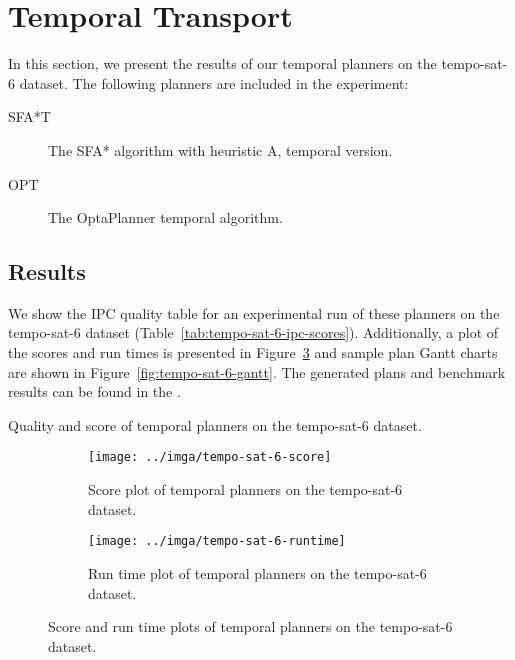 \section{Temporal Transport}

In this section, we present the results of our temporal planners on the tempo-sat-6 dataset. The following planners are included in the experiment:
\begin{description}
\item[SFA*T] The SFA* algorithm with heuristic A, temporal version. 
\item[OPT] The OptaPlanner temporal algorithm. 
\end{description}

\subsection{Results}\label{temporal-results}

We show the IPC quality table
for an experimental run of these planners on the tempo-sat-6 dataset (Table~\ref{tab:tempo-sat-6-ipc-scores}).
Additionally, a plot of the scores and run times is presented in Figure~\ref{fig:tempo-sat-6-plots} and sample plan Gantt charts are shown in Figure~\ref{fig:tempo-sat-6-gantt}. The generated plans and benchmark results can be found in the .

\begin{table}
\centering

\caption{Quality and score of temporal planners on the tempo-sat-6 dataset.}
\label{tab:tempo-sat-6-ipc-scores}
\end{table}

\begin{figure}
\centering
\begin{subfigure}{\textwidth}
\centering
\texttt{[image: ../imga/tempo-sat-6-score]}
\caption{Score plot of temporal planners on the tempo-sat-6 dataset.}
\label{fig:tempo-sat-6-score}
\end{subfigure}

\begin{subfigure}{\textwidth}
\centering
\texttt{[image: ../imga/tempo-sat-6-runtime]}
\caption{Run time plot of temporal planners on the tempo-sat-6 dataset.}
\label{fig:tempo-sat-6-runtime}
\end{subfigure}
\caption{Score and run time plots of temporal planners on the tempo-sat-6 dataset.}
\label{fig:tempo-sat-6-plots}
\end{figure}

